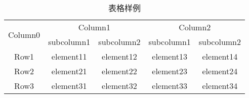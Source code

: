 \documentclass[print, doctor, vlined]{DissertUESTC}
\begin{document}
	\begin{table}[htbp]
		\captionsetup{list=no}%
		\caption{表格样例}
		\begin{tabular}{ccccc}
			\toprule
			\multirow{2}{*}{Column0} &  \multicolumn{2}{c}{Column1\tnote{1}} & \multicolumn{2}{c}{Column2\tnote{2}} \\
			\cmidrule(lr){2-3}\cmidrule(l){4-5}
			~     & subcolumn1 & subcolumn2 & subcolumn1 & subcolumn2 \\
			\midrule
			Row1  & element11 & element12 &element13 & element14 \\
			Row2  & element21 & element22 &element23 & element24 \\
			\cmidrule{2-3}\cmidrule{4-5}
			Row3  & element31 & element32 &element33 & element34 \\
			\bottomrule
		\end{tabular}
	\end{table}




\end{document}
